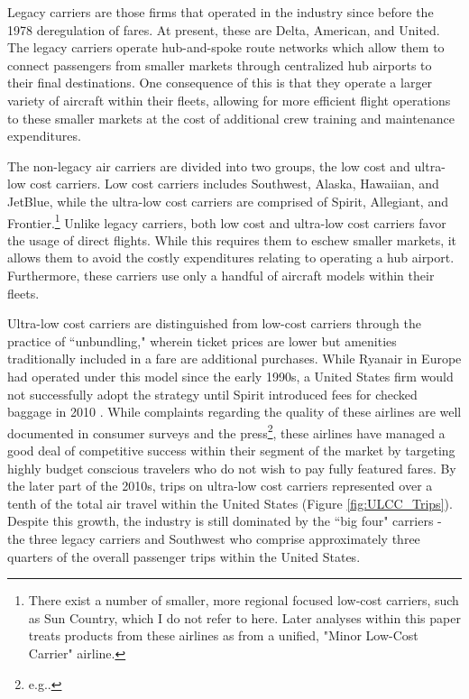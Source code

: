 \documentclass{article}
\begin{document}
	Legacy carriers are those firms that operated in the industry since before the 1978 deregulation of fares. At present, these are Delta, American, and United. The legacy carriers operate hub-and-spoke route networks which allow them to connect passengers from smaller markets through centralized hub airports to their final destinations. One consequence of this is that they operate a larger variety of aircraft within their fleets, allowing for more efficient flight operations to these smaller markets at the cost of additional crew training and maintenance expenditures.   
	
	The non-legacy air carriers are divided into two groups, the low cost and ultra-low cost carriers. Low cost carriers includes Southwest, Alaska,  Hawaiian, and JetBlue, while the ultra-low cost carriers are comprised of Spirit, Allegiant, and Frontier.\footnote{There exist a number of smaller, more regional focused low-cost carriers, such as Sun Country, which I do not refer to here. Later analyses within this paper treats products from these airlines as from a unified, "Minor Low-Cost Carrier" airline.} Unlike legacy carriers, both low cost and ultra-low cost carriers favor the usage of direct flights. While this requires them to eschew smaller markets, it allows them to avoid the costly expenditures relating to operating a hub airport. Furthermore, these carriers use only a handful of aircraft models within their fleets.

	Ultra-low cost carriers are distinguished from low-cost carriers through the practice of ``unbundling," wherein ticket prices are lower but amenities traditionally included in a fare are additional purchases. While Ryanair in Europe had operated under this model since the early 1990s, a United States firm would not successfully adopt the strategy until Spirit introduced fees for checked baggage in 2010 \citep{bachwich_emergence_2017}. While complaints regarding the quality of these airlines are well documented in consumer surveys and the press\footnote{e.g.\citet{vasel_spirit_2016, elliott_jetblue_2022}.}, these airlines have managed a good deal of competitive success within their segment of the market by targeting highly budget conscious travelers who do not wish to pay fully featured fares. By the later part of the 2010s, trips on ultra-low cost carriers represented over a tenth of the total air travel within the United States (Figure \ref{fig:ULCC_Trips}).  Despite this growth, the industry is still dominated by the ``big four" carriers - the three legacy carriers and Southwest who comprise approximately three quarters of the overall passenger trips within the United States. 
\end{document}
